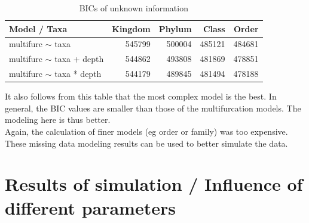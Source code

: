       \begin{table}[h!]
        \begin{center}
          \begin{tabular}{ |l|r|r|r|r| }
            \hline
            Model / Taxa & Kingdom & Phylum & Class & Order \\
            \hline \hline
            multifurc $\sim$ taxa & \cellcolor{green!15}545799 & \cellcolor{green!35}500004 & \cellcolor{green!45}485121 & \cellcolor{green!45}484681 \\
            \hline
            multifurc $\sim$ taxa + depth & \cellcolor{green!15}544862 & \cellcolor{green!40}493808 & \cellcolor{green!45}481869 & \cellcolor{green!50}478851 \\
            \hline
            multifurc $\sim$ taxa * depth & \cellcolor{green!15}544179 & \cellcolor{green!45}489845 & \cellcolor{green!45}481494 & \cellcolor{green!50}478188 \\
            \hline
          \end{tabular} 
        \end{center}
        \caption{BICs of unknown information}
        \label{table:BIC unknown information} 
      \end{table}
      It also follows from this table that the most complex model is the best. In general, the BIC 
        values are smaller than those of the multifurcation models. The modeling here is thus better. \\
      Again, the calculation of finer models (eg order or family) was too expensive. \\

      These missing data modeling results can be used to better simulate the data.

  \section{Results of simulation / Influence of different parameters}

